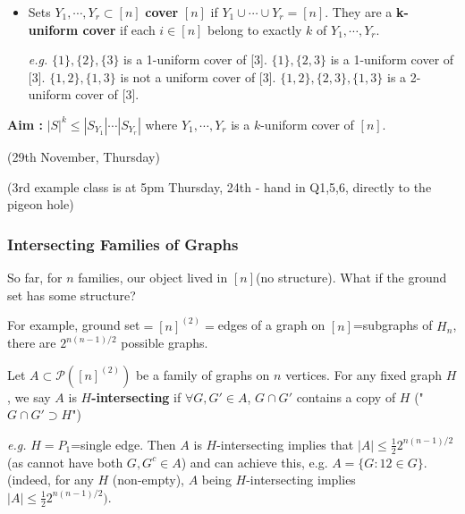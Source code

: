 \documentclass[12pt,a4paper]{report}
\begin{document}
\begin{itemize}
\item Sets $Y_1, \cdots, Y_r \subset[n]$ \textbf{cover} $[n]$ if $Y_1\cup \cdots \cup Y_r =[n]$. They are a \textbf{k-uniform cover} if each $i\in [n]$ belong to exactly $k$ of $Y_1, \cdots, Y_r$.

\textit{e.g.} $\{1\},\{2\},\{3\}$ is a 1-uniform cover of [3]. $\{1\},\{2,3\}$ is a 1-uniform cover of [3]. $\{1,2\}, \{1,3\}$ is not a uniform cover of [3]. $\{1,2\},\{2,3\},\{1,3\}$ is a 2-uniform cover of [3].
\s
\end{itemize}
\s

\textbf{Aim :} $|S|^k \leq |S_{Y_1}| \cdots |S_{Y_r}|$ where $Y_1, \cdots, Y_r$ is a $k$-uniform cover of $[n]$.
\s

\newpage

\newday

(29th November, Thursday)
\s

(3rd example class is at 5pm Thursday, 24th - hand in Q1,5,6, directly to the pigeon hole)

\subsubsection*{Intersecting Families of Graphs}

So far, for $n$ families, our object lived in $[n]$(no structure). What if the ground set has some structure?
\s

For example, ground set$=[n]^{(2)}=$edges of a graph on $[n]$=subgraphs of $H_n$, there are $2^{n(n-1)/2}$ possible graphs.
\s

Let $A \subset \mathscr{P}([n]^{(2)})$ be a family of graphs on $n$ vertices. For any fixed graph $H$, we say $A$ is \textbf{$H$-intersecting} if $\forall G, G' \in A$, $G\cap G'$ contains a copy of $H$ ("$G\cap G' \supset H$")

\textit{e.g.} $H=P_1$=single edge. Then $A$ is $H$-intersecting implies that $|A| \leq \frac{1}{2} 2^{n(n-1)/2}$ (as cannot have both $G, G^c \in A$) and can achieve this, e.g. $A =\{G : 12\in G\}$. (indeed, for any $H$ (non-empty), $A$ being $H$-intersecting implies $|A| \leq \frac{1}{2}2^{n(n-1)/2})$.
\s
\end{document}
